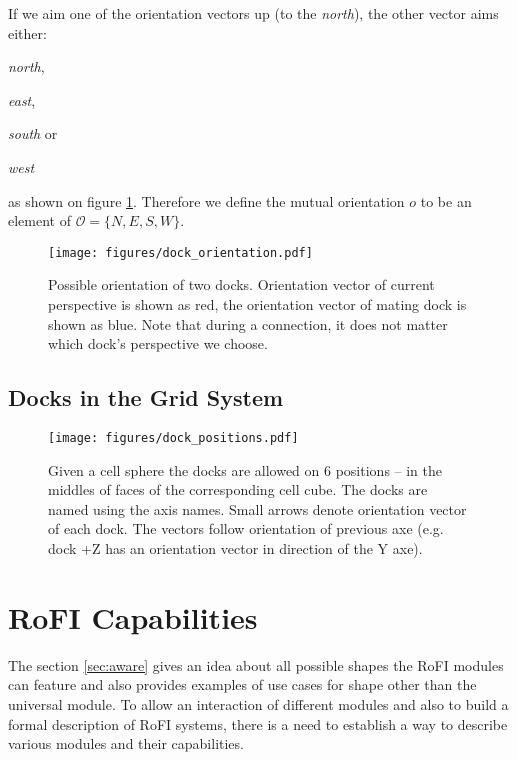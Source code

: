 If we aim one of the orientation vectors up (to the \emph{north}), the other
vector aims either:
\begin{enumerate*}
    \item \emph{north},
    \item \emph{east},
    \item \emph{south} or
    \item \emph{west}
\end{enumerate*}
as shown on figure \ref{fig:dock_orientation}. Therefore we define the mutual
orientation $o$ to be an element of $\mathcal{O} = \{N, E, S, W\}$.

\begin{figure}
    \centering
    \texttt{[image: figures/dock\_orientation.pdf]}
    \caption{Possible orientation of two docks. Orientation vector of current
    perspective is shown as red, the orientation vector of mating dock is shown
    as blue. Note that during a connection, it does not matter which dock's
    perspective we choose.}
    \label{fig:dock_orientation}
\end{figure}


\subsection{Docks in the Grid System}

\begin{figure}
    \centering
    \texttt{[image: figures/dock\_positions.pdf]}
    \caption{Given a cell sphere the docks are allowed on 6 positions -- in the
    middles of faces of the corresponding cell cube. The docks are named using
    the axis names. Small arrows denote orientation vector of each dock. The
    vectors follow orientation of previous axe (e.g. dock +Z has an orientation
    vector in direction of the Y axe).  }
    \label{fig:dock_positions}
\end{figure}


\section{RoFI Capabilities}\label{sec:capabilities}

The section \ref{sec:aware} gives an idea about all possible shapes the RoFI
modules can feature and also provides examples of use cases for shape other than
the universal module. To allow an interaction of different modules and also to
build a formal description of RoFI systems, there is a need to establish a way
to describe various modules and their capabilities.

